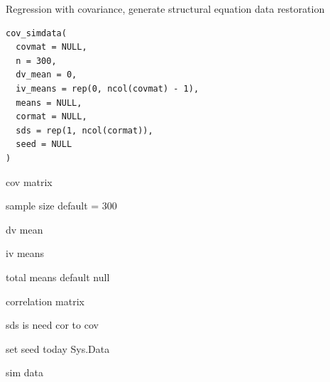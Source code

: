\documentclass[a4paper]{book}
\begin{document}
\begin{Examples}
\end{Examples}

%
\begin{Description}
Regression with covariance, generate structural equation data restoration
\end{Description}
%
\begin{Usage}
\begin{verbatim}
cov_simdata(
  covmat = NULL,
  n = 300,
  dv_mean = 0,
  iv_means = rep(0, ncol(covmat) - 1),
  means = NULL,
  cormat = NULL,
  sds = rep(1, ncol(cormat)),
  seed = NULL
)
\end{verbatim}
\end{Usage}
%
\begin{Arguments}
\begin{ldescription}
\item[\code{covmat}] cov matrix

\item[\code{n}] sample size default = 300

\item[\code{dv\_mean}] dv mean

\item[\code{iv\_means}] iv means

\item[\code{means}] total means default null

\item[\code{cormat}] correlation matrix

\item[\code{sds}] sds is need cor to cov

\item[\code{seed}] set seed today Sys.Data
\end{ldescription}
\end{Arguments}
%
\begin{Value}
sim data
\end{Value}
\end{document}
